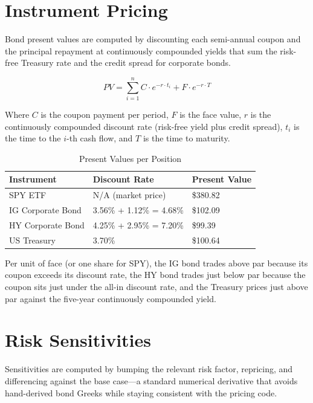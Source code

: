 \documentclass[11pt, a4paper]{article}
\begin{document}
\section{Instrument Pricing}

Bond present values are computed by discounting each semi-annual coupon and the principal repayment at continuously compounded yields that sum the risk-free Treasury rate and the credit spread for corporate bonds.

\begin{equation}
PV = \sum_{i=1}^{n} C \cdot e^{-r \cdot t_i} 
+ F \cdot e^{-r \cdot T}
\end{equation}

Where $C$ is the coupon payment per period, $F$ 
is the face value, $r$ is the continuously compounded discount rate (risk-free yield plus 
credit spread), $t_i$ is the time to the $i$-th cash flow, and $T$ is the time to maturity.

\begin{table}[H]
\centering
\caption{Present Values per Position}
\begin{tabularx}{\textwidth}{lXX}
\toprule
\textbf{Instrument} & \textbf{Discount Rate} & 
\textbf{Present Value} \\
\midrule
SPY ETF & N/A (market price) & \$380.82 \\
IG Corporate Bond & 3.56\% + 1.12\% = 4.68\% & 
\$102.09 \\
HY Corporate Bond & 4.25\% + 2.95\% = 7.20\% & 
\$99.39 \\
US Treasury & 3.70\% & \$100.64 \\
\bottomrule
\end{tabularx}
\end{table}

Per unit of face (or one share for SPY), the IG bond trades above par because its coupon exceeds its discount rate, the HY bond trades just below par because the coupon sits just under the all-in discount rate, and the Treasury prices just above par against the five-year continuously compounded yield.

\section{Risk Sensitivities}

Sensitivities are computed by bumping the relevant risk factor, repricing, and differencing against the base case---a standard numerical derivative that avoids hand-derived bond Greeks while staying consistent with the pricing code.
\end{document}
